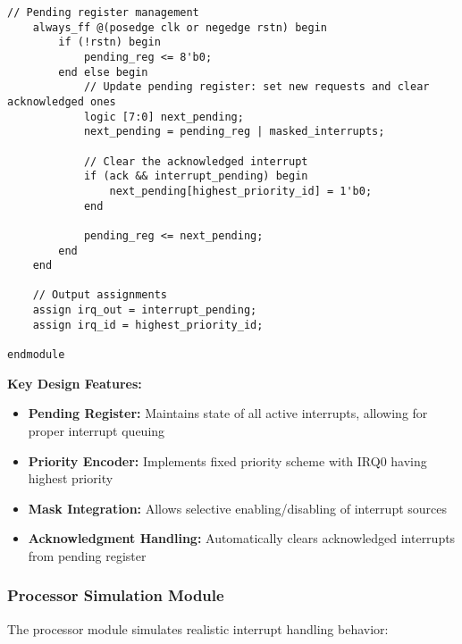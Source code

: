 \documentclass[12pt,a4paper]{article}
\begin{document}
\begin{lstlisting}[caption=Interrupt Controller Core Module, label=lst:ic_core]
    // Pending register management
    always_ff @(posedge clk or negedge rstn) begin
        if (!rstn) begin
            pending_reg <= 8'b0;
        end else begin
            // Update pending register: set new requests and clear acknowledged ones
            logic [7:0] next_pending;
            next_pending = pending_reg | masked_interrupts;
            
            // Clear the acknowledged interrupt
            if (ack && interrupt_pending) begin
                next_pending[highest_priority_id] = 1'b0;
            end
            
            pending_reg <= next_pending;
        end
    end

    // Output assignments
    assign irq_out = interrupt_pending;
    assign irq_id = highest_priority_id;

endmodule
\end{lstlisting}

\textbf{Key Design Features:}
\begin{itemize}
    \item \textbf{Pending Register:} Maintains state of all active interrupts, allowing for proper interrupt queuing
    \item \textbf{Priority Encoder:} Implements fixed priority scheme with IRQ0 having highest priority
    \item \textbf{Mask Integration:} Allows selective enabling/disabling of interrupt sources
    \item \textbf{Acknowledgment Handling:} Automatically clears acknowledged interrupts from pending register
\end{itemize}

\subsubsection{Processor Simulation Module}
The processor module simulates realistic interrupt handling behavior:
\end{document}
